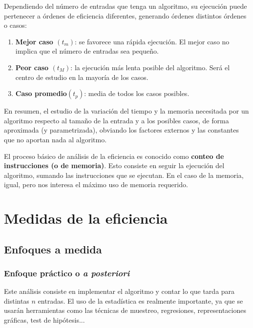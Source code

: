 \documentclass[10pt,a4paper,spanish]{report}
\theoremstyle{definition}
\theoremstyle{remark}
\begin{document}
    Dependiendo del número de entradas que tenga un algoritmo, su ejecución puede pertenecer a órdenes de eficiencia diferentes, generando órdenes distintos órdenes o casos:

    \begin{enumerate}[$\spadesuit$]
        \item \textbf{\textcolor{YellowOrange}{Mejor caso $(t_m)$}}: se favorece una rápida ejecución. El mejor caso no implica que el número de entradas sea pequeño.
        \item \textbf{\textcolor{YellowOrange}{Peor caso $(t_M)$}}: la ejecución más lenta posible del algoritmo. Será el centro de estudio en la mayoría de los casos.
        \item \textbf{\textcolor{YellowOrange}{Caso promedio$(t_p)$}}: media de todos los casos posibles.
    \end{enumerate}

    En resumen, el estudio de la variación del tiempo y la memoria necesitada por un algoritmo respecto al tamaño de la entrada y a los posibles casos, de forma aproximada (y parametrizada), obviando los factores externos y las constantes que no aportan nada al algoritmo.

    El proceso básico de análisis de la eficiencia es conocido como \textbf{\textcolor{YellowOrange}{conteo de instrucciones (o de memoria)}}. Esto consiste en seguir la ejecución del algoritmo, sumando las instrucciones que se ejecutan. En el caso de la memoria, igual, pero nos interesa el máximo uso de memoria requerido.

    \section{\textcolor{YellowOrange}Medidas de la eficiencia}
    \subsection{\textcolor{YellowOrange}Enfoques a medida}

    \subsubsection{\textcolor{YellowOrange}Enfoque práctico o \textit{a posteriori}}

    Este análisis consiste en implementar el algoritmo y contar lo que tarda para distintas $n$ entradas. El uso de la estadística es realmente importante, ya que se usarán herramientas como las técnicas de muestreo, regresiones, representaciones gráficas, test de hipótesis...
\end{document}
